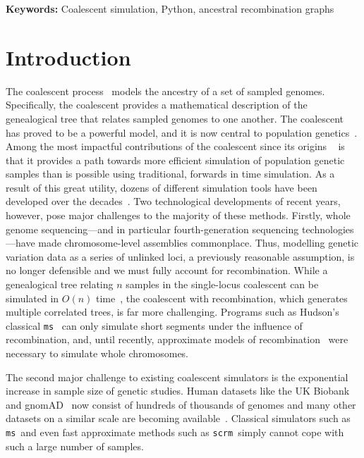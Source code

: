 \documentclass{article}
\newcommand{\ms}[0]{\texttt{ms}}
\newcommand{\scrm}[0]{\texttt{scrm}}
\begin{document}
\textbf{Keywords:} Coalescent simulation, Python, ancestral recombination graphs

\section*{Introduction}

The coalescent
process~\citep{kingman1982coalescent,hudson1983testing,tajima1983evolutionary}
models the ancestry of a set of sampled genomes. Specifically,
the coalescent provides a mathematical description of the
genealogical tree that relates sampled genomes to one another.
The coalescent has proved to be a powerful model,
and it is now central to
population genetics~\citep{hudson1990gene,hein2004gene,wakely2008coalescent}.
Among the most impactful contributions of the coalescent since its origins
~\citep{hudson1983testing} is that it provides a path towards more efficient
simulation of population genetic samples than is possible using traditional,
forwards in time simulation.
As a result of this great utility, dozens of different simulation tools have been
developed over the decades~\citep{carvajal2008simulation,liu2008survey,
arenas2012simulation,yuan2012overview,hoban2012computer,yang2014critical,
peng2015genetic}.
Two technological developments of recent years, however,
pose major challenges to the majority of these methods.
Firstly, whole genome sequencing---and in particular fourth-generation
sequencing technologies---have made chromosome-level assemblies
commonplace. Thus, modelling genetic variation data as a series of unlinked loci,
a previously reasonable assumption, is no longer defensible and
we must fully account for recombination.
While a genealogical tree relating $n$ samples in the single-locus coalescent
can be simulated in $O(n)$ time~\citep{hudson1990gene},
the coalescent with recombination, which generates multiple correlated trees, is
far more challenging.
Programs such as Hudson's classical \ms~\citep{hudson2002generating}
can only simulate short segments under the influence of recombination,
and, until recently, approximate models of
recombination~\citep{mcvean2005approximating,staab2015scrm}
were necessary to simulate whole chromosomes.

The second major challenge to existing coalescent simulators is the
exponential increase in sample size of genetic studies. Human datasets like the
UK Biobank~\citep{bycroft2018genome} and
gnomAD~\citep{karczewski2020mutational} now consist of hundreds of
thousands of genomes and many other datasets on a similar scale
are becoming available~\citep{tanjo2021practical}.
Classical simulators such as \ms\ and even fast approximate methods
such as \scrm\ simply cannot cope with such a large number of samples.
\end{document}
